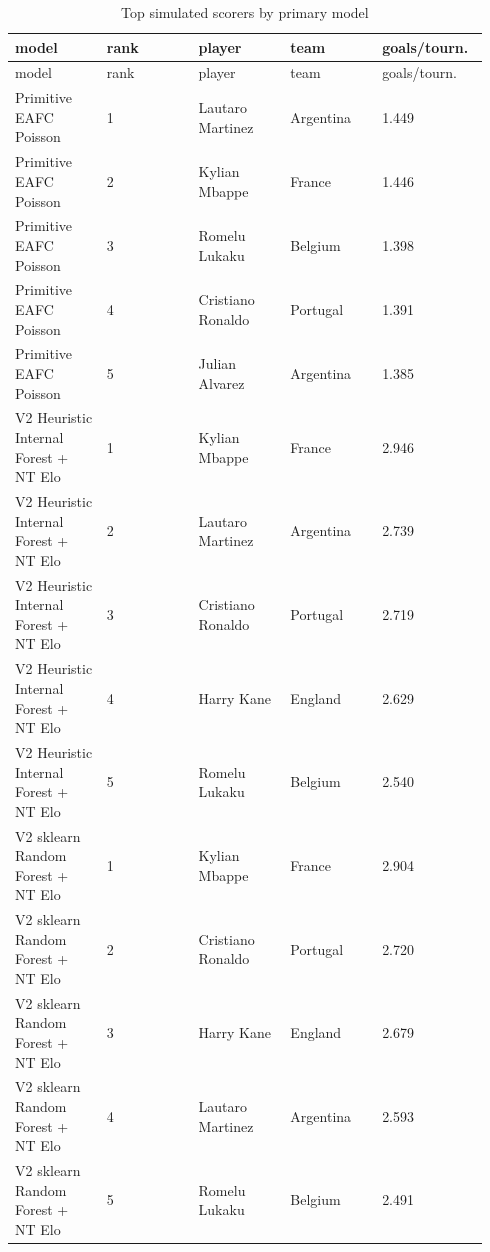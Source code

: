\documentclass[10pt]{article}
\begin{document}
\begin{longtable}{p{0.188\linewidth}p{0.188\linewidth}p{0.188\linewidth}p{0.188\linewidth}p{0.188\linewidth}}
\caption{Top simulated scorers by primary model}\\
\toprule
model & rank & player & team & goals/tourn. \\
\midrule
\endfirsthead
\toprule
model & rank & player & team & goals/tourn. \\
\midrule
\endhead
Primitive EAFC Poisson & 1 & Lautaro Martinez & Argentina & 1.449 \\
Primitive EAFC Poisson & 2 & Kylian Mbappe & France & 1.446 \\
Primitive EAFC Poisson & 3 & Romelu Lukaku & Belgium & 1.398 \\
Primitive EAFC Poisson & 4 & Cristiano Ronaldo & Portugal & 1.391 \\
Primitive EAFC Poisson & 5 & Julian Alvarez & Argentina & 1.385 \\
V2 Heuristic Internal Forest + NT Elo & 1 & Kylian Mbappe & France & 2.946 \\
V2 Heuristic Internal Forest + NT Elo & 2 & Lautaro Martinez & Argentina & 2.739 \\
V2 Heuristic Internal Forest + NT Elo & 3 & Cristiano Ronaldo & Portugal & 2.719 \\
V2 Heuristic Internal Forest + NT Elo & 4 & Harry Kane & England & 2.629 \\
V2 Heuristic Internal Forest + NT Elo & 5 & Romelu Lukaku & Belgium & 2.540 \\
V2 sklearn Random Forest + NT Elo & 1 & Kylian Mbappe & France & 2.904 \\
V2 sklearn Random Forest + NT Elo & 2 & Cristiano Ronaldo & Portugal & 2.720 \\
V2 sklearn Random Forest + NT Elo & 3 & Harry Kane & England & 2.679 \\
V2 sklearn Random Forest + NT Elo & 4 & Lautaro Martinez & Argentina & 2.593 \\
V2 sklearn Random Forest + NT Elo & 5 & Romelu Lukaku & Belgium & 2.491 \\
\bottomrule
\end{longtable}
\end{document}
